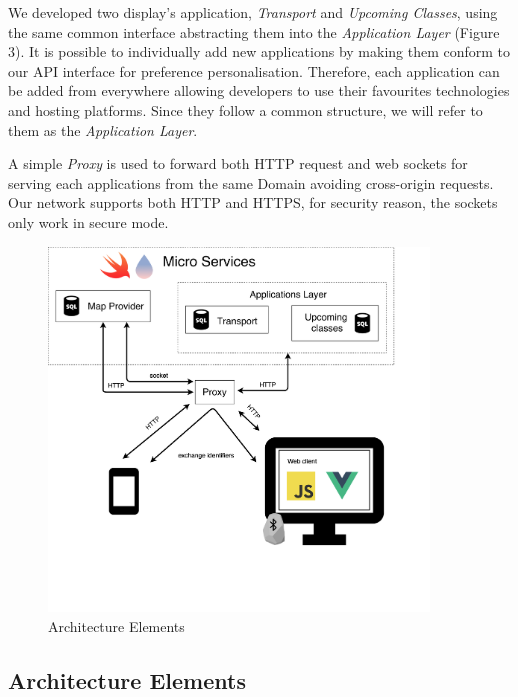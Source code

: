 \documentclass[]{usiinfbachelorproject}
\begin{document}
We developed two display's application, \emph{Transport} and \emph{Upcoming Classes}, using the same common interface abstracting them into the \emph{Application Layer} (Figure 3). It is possible to individually add new applications by making them conform to our API interface for preference personalisation. Therefore, each application can be added from everywhere allowing developers to use their favourites technologies and hosting platforms.
Since they follow a common structure, we will refer to them as the \emph{Application Layer}.

A simple \emph{Proxy} is used to forward both HTTP request and web sockets for serving each applications from the same Domain avoiding cross-origin requests. Our network supports both HTTP and HTTPS, for security reason, the sockets only work in secure mode.
\begin{figure}[H]
  \centering
  \includegraphics[width=0.9\textwidth]{./images/poster_image_1.png}
    \caption{Architecture Elements}
\end{figure} 


%
\subsection{Architecture Elements}
\end{document}
